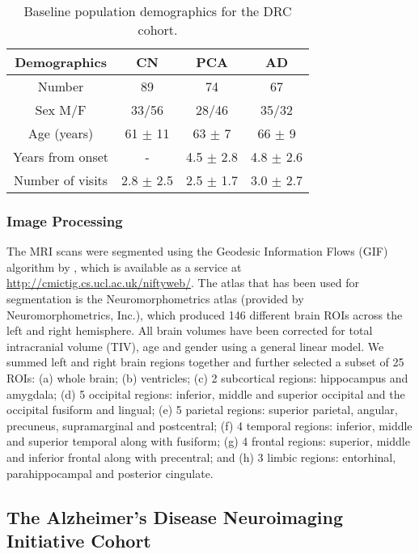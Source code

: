 \begin{table}[ht]
\centering
 \begin{tabular}{c | c c c}
  Demographics & CN & PCA & AD\\
  \hline
  Number & 89 & 74 & 67\\
  Sex M/F & 33/56 & 28/46 & 35/32 \\
  Age (years) & 61 $\pm$ 11 & 63 $\pm$ 7 & 66 $\pm$ 9\\
  Years from onset & - & 4.5 $\pm$ 2.8 & 4.8 $\pm$ 2.6\\
  Number of visits & 2.8 $\pm$ 2.5 & 2.5 $\pm$ 1.7 & 3.0 $\pm$ 2.7\\
 \end{tabular}
 \caption[Baseline population demographics for DRC data]{Baseline population demographics for the DRC cohort.}
 \label{tab:drcDemographics}
\end{table}

\subsubsection{Image Processing}
The MRI scans were segmented using the Geodesic Information Flows (GIF) algorithm by \cite{cardoso2015geodesic}, which is available as a service at \url{http://cmictig.cs.ucl.ac.uk/niftyweb/}. The atlas that has been used for segmentation is the Neuromorphometrics atlas (provided by Neuromorphometrics, Inc.), which produced 146 different brain ROIs across the left and right hemisphere. All brain volumes have been corrected for total intracranial volume (TIV), age and gender using a general linear model. We summed left and right brain regions together and further selected a subset of 25 ROIs: (a) whole brain; (b) ventricles; (c) 2 subcortical regions: hippocampus and amygdala; (d) 5 occipital regions: inferior, middle and superior occipital and the occipital fusiform and lingual; (e) 5 parietal regions: superior parietal, angular, precuneus, supramarginal and postcentral; (f) 4 temporal regions: inferior, middle and superior temporal along with fusiform; (g) 4 frontal regions: superior, middle and inferior frontal along with precentral; and (h) 3 limbic regions: entorhinal, parahippocampal and posterior cingulate.

\subsection{The Alzheimer's Disease Neuroimaging Initiative Cohort}

